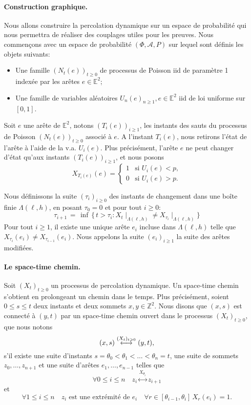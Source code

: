 \documentclass[titlepage,a4paper,12pt]{article}
\begin{document}
\paragraph{Construction graphique.} Nous allons construire la percolation dynamique sur un espace de probabilité qui nous permettra de réaliser des couplages utiles pour les preuves. Nous commençons avec un espace de probabilité $(\Phi, \mathcal{A},P)$ sur lequel sont définis les objets suivants:

\begin{itemize}[label = $\bullet$, leftmargin = *]
\item Une famille $(N_t(e))_{t\geqslant 0}$ de processus de Poisson iid de paramètre 1 indexée par les arêtes $e \in \mathbb{E}^2$;
\item Une famille de variables aléatoires $U_n(e)_{n\geqslant 1}, e\in \mathbb{E}^2$ iid de loi uniforme sur $[0,1]$.
\end{itemize} 


Soit $e$ une arête de $\mathbb{E}^2$, notons $(T_i(e))_{i\geqslant 1}$, les instants des sauts du processus de Poisson $(N_t(e))_{t\geqslant 0}$ associé à $e$. A l'instant $T_i(e)$, nous retirons l'état de l'arête à l'aide de la v.a. $U_i(e)$.
Plus précisément, l'arête $e$ ne peut changer d'état qu'aux instants $(T_i(e))_{i\geqslant 1}$, et nous posons 
$$ X_{T_i(e)}(e) = \left\lbrace \begin{array}{cc}
1 & \text{si }U_i(e) < p, \\
0 & \text{si }U_i(e) > p.
\end{array}
\right.
$$

Nous définissons la suite $(\tau_i)_{i\geqslant 0}$ des instants de changement dans une boîte finie $\Lambda(\ell,h)$, en posant $\tau_0 = 0$ et pour tout $i\geqslant 0$:
$$\tau_{i+1} \,=\, \inf \,\big\{ \, t>\tau_i: {X_t}\mid_{ \Lambda(\ell,h)} \neq {X_{\tau_i}}\mid_{ \Lambda(\ell,h)} \big \}
$$
Pour tout $i\geqslant 1$, il existe une unique arête $e_i$ incluse dans $\Lambda(\ell,h)$ telle que $X_{\tau_i}(e_i) \neq X_{\tau_{i-1}}(e_i)$. Nous appelons la suite $(e_i)_{i\geqslant 1}$ la suite des arêtes modifiées.

\paragraph{Le space-time chemin.} Soit $(X_t)_{t\geqslant 0}$ un processus de percolation dynamique. Un space-time chemin s'obtient en prolongeant un chemin dans le temps. Plus précisément, soient $0\leqslant s\leqslant t$ deux instants et deux sommets $x,y\in\mathbb{Z}^2$. Nous disons que $(x,s)$ est connecté à $(y,t)$ par un space-time chemin ouvert dans le processus $(X_t)_{t\geqslant 0}$, que nous notons $$(x,s)\overset{\small(X_t)_{t\geqslant 0}}{\longleftrightarrow} (y,t),$$ s'il existe une suite d'instants $s =\theta_0 <\theta_1 < \dots < \theta_n = t$, une suite de sommets $z_0,\dots, z_{n+1}$ et une suite d'arêtes $e_1,\dots, e_{n-1}$ telles que 
$$ \forall 0 \leqslant i \leqslant n  \quad z_i \overset{X_{\theta_i}}{\longleftrightarrow} z_{i+1}
$$
et $$ \forall 1\leqslant i\leqslant n \quad z_i \text{ est une extrémité de } e_i\quad  \forall r\in  [\theta_{i-1},\theta_i] \,X_r(e_i) = 1.
$$
\end{document}
